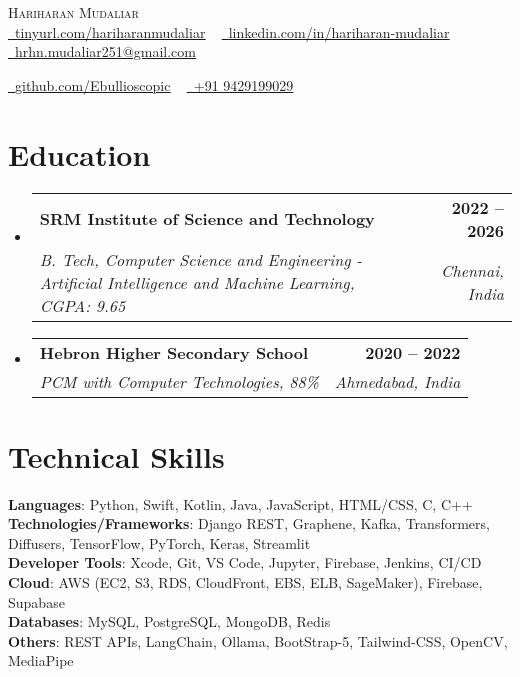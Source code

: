 \documentclass[letterpaper,11pt]{article}
\makeatletter
\newcommand{\resumeSubheading}[4]{
  \vspace{-2pt}\item
    \begin{tabular*}{1.0\textwidth}[t]{l@{\extracolsep{\fill}}r}
      \textbf{#1} & \textbf{\small #2} \\
      \textit{\small#3} & \textit{\small #4} \\
    \end{tabular*}\vspace{-7pt}
}
\newcommand{\resumeSubHeadingListStart}{\begin{itemize}[leftmargin=0.0in, label={}]}
\newcommand{\resumeSubHeadingListEnd}{\end{itemize}}
\makeatother
\begin{document}
\begin{center}
    {\Huge \scshape Hariharan Mudaliar} \\ \vspace{1pt}
    \href{https://tinyurl.com/hariharanmudaliar}{\raisebox{-0.2\height}\faLink\ \underline{tinyurl.com/hariharanmudaliar}} ~
    \href{https://linkedin.com/in/hariharan-mudaliar}{\raisebox{-0.2\height}\faLinkedin\ \underline{linkedin.com/in/hariharan-mudaliar}} ~
    \href{mailto:hrhn.mudaliar251@gmail.com}{\raisebox{-0.2\height}\faEnvelope\ \underline{hrhn.mudaliar251@gmail.com}} ~
    
    \href{https://github.com/Ebullioscopic}{\raisebox{-0.2\height}\faGithub\ \underline{github.com/Ebullioscopic}} ~
    \href{tel:+919429199029}{\raisebox{-0.2\height}\faPhone\ +91 9429199029}
\end{center}

\section{Education}
\resumeSubHeadingListStart
  \resumeSubheading
    {SRM Institute of Science and Technology}{2022 -- 2026}
    {B. Tech, Computer Science and Engineering - Artificial Intelligence and Machine Learning, CGPA: 9.65}{Chennai, India}
\resumeSubHeadingListEnd

\resumeSubHeadingListStart
  \resumeSubheading
    {Hebron Higher Secondary School}{2020 -- 2022}
    {PCM with Computer Technologies, 88\%}{Ahmedabad, India}
\resumeSubHeadingListEnd


\section{Technical Skills}
 \begin{itemize}[leftmargin=0.15in, label={}]
    \small{\item{
     \textbf{Languages}{: Python, Swift, Kotlin, Java, JavaScript, HTML/CSS, C, C++} \\
     \textbf{Technologies/Frameworks}{: Django REST, Graphene, Kafka, Transformers, Diffusers, TensorFlow, PyTorch, Keras, Streamlit} \\
     \textbf{Developer Tools}{: Xcode, Git, VS Code, Jupyter, Firebase, Jenkins, CI/CD} \\
     \textbf{Cloud}{: AWS (EC2, S3, RDS, CloudFront, EBS, ELB, SageMaker), Firebase, Supabase} \\
     \textbf{Databases}{: MySQL, PostgreSQL, MongoDB, Redis} \\
     \textbf{Others}{: REST APIs, LangChain, Ollama, BootStrap-5, Tailwind-CSS, OpenCV, MediaPipe} \\
    }}
 \end{itemize}
\end{document}
